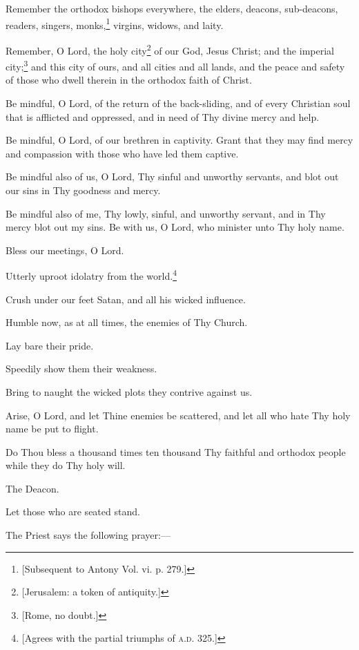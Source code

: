 Remember the orthodox bishops everywhere, the elders, deacons, sub-deacons, readers, singers, monks,\footnote{\par{}  [Subsequent to Antony Vol. vi. p. 279.]} virgins, widows, and laity.

Remember, O Lord, the holy city\footnote{\par{}  [Jerusalem: a token of antiquity.]} of our God, Jesus Christ; and the imperial city;\footnote{\par{}  [Rome, no doubt.]} and this city of ours, and all cities and all lands, and the peace and safety of those who dwell therein in the orthodox faith of Christ.

Be mindful, O Lord, of the return of the back-sliding, and of every Christian soul that is afflicted and oppressed, and in need of Thy divine mercy and help.

Be mindful, O Lord, of our brethren in captivity. Grant that they may find mercy and compassion with those who have led them captive.

Be mindful also of us, O Lord, Thy sinful and unworthy servants, and blot out our sins in Thy goodness and mercy.

Be mindful also of me, Thy lowly, sinful, and unworthy servant, and in Thy mercy blot out my sins. Be with us, O Lord, who minister unto Thy holy name.

Bless our meetings, O Lord.

Utterly uproot idolatry from the world.\footnote{\par{}  [Agrees with the partial triumphs of \textsc{a.d.} 325.]}

Crush under our feet Satan, and all his wicked influence.

Humble now, as at all times, the enemies of Thy Church.

Lay bare their pride.

Speedily show them their weakness.

Bring to naught the wicked plots they contrive against us.

Arise, O Lord, and let Thine enemies be scattered, and let all who hate Thy holy name be put to flight.

Do Thou bless a thousand times ten thousand Thy faithful and orthodox people while they do Thy holy will.

The Deacon.

Let those who are seated stand.

The Priest says the following prayer:—

